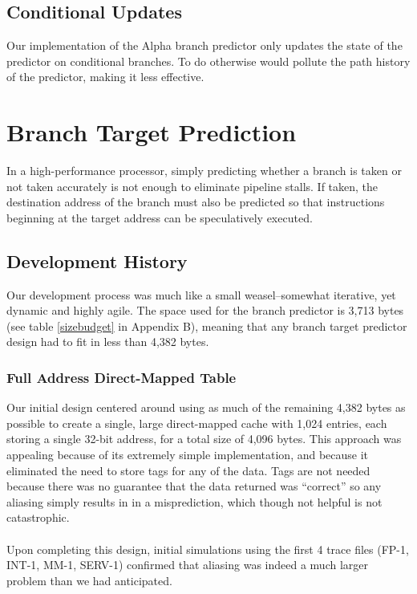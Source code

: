 \documentclass[twocolumn]{article}
\begin{document}
\subsection{Conditional Updates}
Our implementation of the Alpha branch predictor only updates the state of the predictor on conditional branches. To do otherwise would pollute the path history of the predictor, making it less effective. 
\section{Branch Target Prediction}
In a high-performance processor, simply predicting whether a branch is taken or not taken accurately is not enough to eliminate pipeline stalls.  If taken, the destination address of the branch must also be predicted so that instructions beginning at the target address can be speculatively executed. 
\subsection{Development History}
Our development process was much like a small weasel--somewhat iterative, yet dynamic and highly agile.  The space used for the branch predictor is 3,713 bytes (see table \ref{sizebudget} in Appendix B), meaning that any branch target predictor design had to fit in less than 4,382 bytes.
\subsubsection{Full Address Direct-Mapped Table}
Our initial design centered around using as much of the remaining 4,382 bytes as possible to create a single, large direct-mapped cache with 1,024 entries, each storing a single 32-bit address, for a total size of 4,096 bytes.  This approach was appealing because of its extremely simple implementation, and because it eliminated the need to store tags for any of the data.  Tags are not needed because there was no guarantee that the data returned was ``correct'' so any aliasing simply results in in a misprediction, which though not helpful is not catastrophic. \\\\
Upon completing this design, initial simulations using the first 4 trace files (FP-1, INT-1, MM-1, SERV-1) confirmed that aliasing was indeed a much larger problem than we had anticipated.
\end{document}

